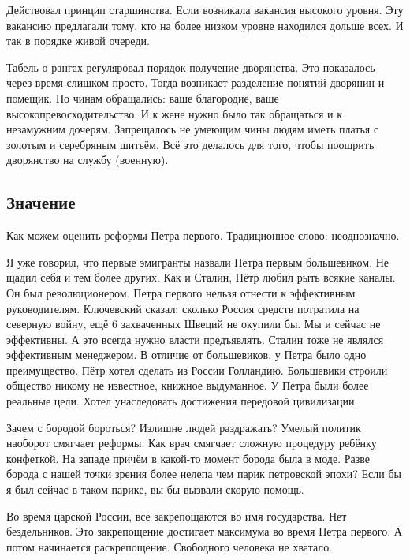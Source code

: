 Действовал принцип старшинства. Если возникала вакансия высокого уровня. Эту вакансию предлагали тому, кто на более низком уровне находился дольше всех. И так в порядке живой очереди.

Табель о рангах регуляровал порядок получение дворянства. Это показалось через время слишком просто. Тогда возникает разделение понятий дворянин и помещик. 
По чинам обращались: ваше благородие, \ldotst{} ваше высокопревосходительство. И к жене нужно было так обращаться и к незамужним дочерям.
Запрещалось не умеющим чины людям иметь платья с золотым и серебряным шитьём. Всё это делалось для того, чтобы поощрить дворянство на службу (военную).
\subsection{Значение}
Как можем оценить реформы Петра первого. Традиционное слово: неоднозначно.

Я уже говорил, что первые эмигранты назвали Петра первым большевиком. Не щадил себя и тем более других. Как и Сталин, Пётр любил рыть всякие каналы. Он был революционером.
Петра первого нельзя отнести к эффективным руководителям. Ключевский сказал: сколько Россия средств потратила на северную войну, ещё 6 захваченных Швеций не окупили бы. Мы и сейчас не 
эффективны. А это всегда нужно власти предъявлять. Сталин тоже не являлся эффективным менеджером. В отличие от большевиков, у Петра было одно преимущество. Пётр хотел сделать из России Голландию. 
Большевики строили общество никому не известное, книжное выдуманное. У Петра были более реальные цели. Хотел унаследовать достижения передовой цивилизации. 

Зачем с бородой бороться? Излишне людей раздражать? Умелый политик наоборот смягчает реформы. Как врач смягчает сложную процедуру ребёнку конфеткой.
На западе причём в какой-то момент борода была в моде. Разве борода с нашей точки зрения более нелепа чем парик петровской эпохи? Если бы я был сейчас в таком парике, вы бы вызвали скорую помощь.

Во время царской России, все закрепощаются во имя государства. Нет бездельников. Это закрепощение достигает максимума во время Петра первого. А потом начинается раскрепощение. Свободного человека не хватало. 

